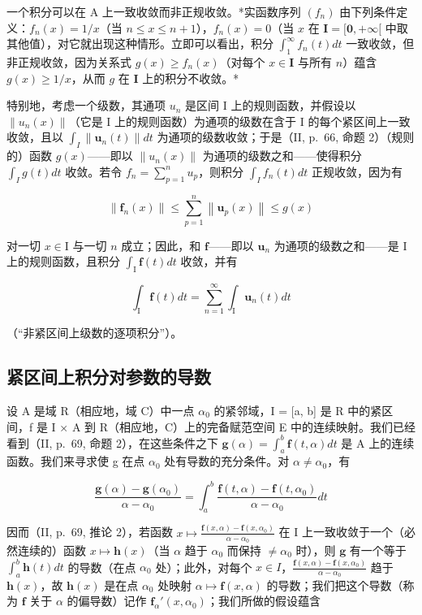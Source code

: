 一个积分可以在 A 上一致收敛而非正规收敛。*实函数序列 \((f_n)\) 由下列条件定义：\(f_n(x) = 1 / x\)（当 \(n \leqslant x \leqslant n + 1\)），\(f_n(x) = 0\)（当 \(x\) 在 \(\mathbf{I} = [\mathbf{0}, +\infty[\) 中取其他值），对它就出现这种情形。立即可以看出，积分 \(\int_{1}^{\infty} f_n(t) dt\) 一致收敛，但非正规收敛，因为关系式 \(g(x) \geqslant f_n(x)\)（对每个 \(x \in \mathbf{I}\) 与所有 \(n\)）蕴含 \(g(x) \geqslant 1 / x\)，从而 \(g\) 在 \(\mathbf{I}\) 上的积分不收敛。*

特别地，考虑一个级数，其通项 \(u_{n}\) 是区间 I 上的规则函数，并假设以 \(\|u_{n}(x)\|\)（它是 I 上的规则函数）为通项的级数在含于 I 的每个紧区间上一致收敛，且以 \(\int_{I}\|\mathbf{u}_{n}(t)\|dt\) 为通项的级数收敛；于是（II, p.~66, 命题 2）（规则的）函数 \(g(x)\)——即以 \(\|u_{n}(x)\|\) 为通项的级数之和——使得积分 \(\int_{I}g(t)dt\) 收敛。若令 \(f_{n}=\sum_{p=1}^{n}u_{p}\)，则积分 \(\int_{I}f_{n}(t)dt\) 正规收敛，因为有

\[
\left\| \mathbf {f} _ {n} (x) \right\| \leqslant \sum_ {p = 1} ^ {n} \left\| \mathbf {u} _ {p} (x) \right\| \leqslant g (x)
\]

对一切 \(x \in \mathrm{I}\) 与一切 \(n\) 成立；因此，和 \(\mathbf{f}\)——即以 \(\mathbf{u}_n\) 为通项的级数之和——是 \(\mathrm{I}\) 上的规则函数，且积分 \(\int_{\mathrm{I}} \mathbf{f}(t) dt\) 收敛，并有

\[
\int_ {\mathrm{I}} \mathbf {f} (t) d t = \sum_ {n = 1} ^ {\infty} \int_ {\mathrm{I}} \mathbf {u} _ {n} (t) d t\tag{11}
\]

（“非紧区间上级数的逐项积分”）。

\subsection{紧区间上积分对参数的导数}

设 A 是域 R（相应地，域 C）中一点 \(\alpha_{0}\) 的紧邻域，I = {[}a, b{]} 是 R 中的紧区间，f 是 I × A 到 R（相应地，C）上的完备赋范空间 E 中的连续映射。我们已经看到（II, p.~69, 命题 2），在这些条件之下 \(\mathbf{g}(\alpha) = \int_{a}^{b} \mathbf{f}(t, \alpha) dt\) 是 A 上的连续函数。我们来寻求使 g 在点 \(\alpha_{0}\) 处有导数的充分条件。对 \(\alpha \neq \alpha_{0}\)，有

\[
\frac {\mathbf {g} (\alpha) - \mathbf {g} (\alpha_ {0})}{\alpha - \alpha_ {0}} = \int_ {a} ^ {b} \frac {\mathbf {f} (t , \alpha) - \mathbf {f} (t , \alpha_ {0})}{\alpha - \alpha_ {0}} d t
\]

因而（II, p.~69, 推论 2），若函数 \(x \mapsto \frac{\mathbf{f}(x, \alpha) - \mathbf{f}(x, \alpha_0)}{\alpha - \alpha_0}\) 在 I 上一致收敛于一个（必然连续的）函数 \(x \mapsto \mathbf{h}(x)\)（当 \(\alpha\) 趋于 \(\alpha_0\) 而保持 \(\neq \alpha_0\) 时），则 \(\mathbf{g}\) 有一个等于 \(\int_{a}^{b} \mathbf{h}(t) dt\) 的导数（在点 \(\alpha_0\) 处）；此外，对每个 \(x \in I\)，\(\frac{\mathbf{f}(x, \alpha) - \mathbf{f}(x, \alpha_0)}{\alpha - \alpha_0}\) 趋于 \(\mathbf{h}(x)\)，故 \(\mathbf{h}(x)\) 是在点 \(\alpha_0\) 处映射 \(\alpha \mapsto \mathbf{f}(x, \alpha)\) 的导数；我们把这个导数（称为 \(\mathbf{f}\) 关于 \(\alpha\) 的偏导数）记作 \(\mathbf{f}_{\alpha}'(x, \alpha_0)\)；我们所做的假设蕴含

